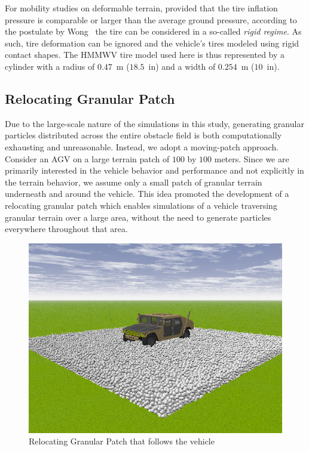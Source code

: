 \documentclass[12pt,twocolumn]{article}
\begin{document}
For mobility studies on deformable terrain, provided that the tire inflation pressure is comparable or larger than the average ground pressure, according to the postulate by Wong~\cite{wong93} the tire can be considered in a so-called {\em rigid regime}.  As such, tire deformation can be ignored and the vehicle's tires modeled using rigid contact shapes.  The HMMWV tire model used here is thus represented by a cylinder with a radius of $0.47$~m ($18.5$~in) and a width of $0.254$~m ($10$~in).



\subsection{Relocating Granular Patch }\label{ss:Patch}

Due to the large-scale nature of the simulations in this study, generating granular particles distributed across the entire obstacle field is both computationally exhausting and unreasonable. Instead, we adopt a moving-patch approach. Consider an AGV on a large terrain patch of $100$ by $100$ meters. Since we are primarily interested in the vehicle behavior and performance and not explicitly in the terrain behavior, we assume only a small patch of granular terrain underneath and around the vehicle. This idea promoted the development of a relocating granular patch which enables simulations of a vehicle traversing granular terrain over a large area, without the need to generate particles everywhere throughout that area. 

\begin{figure}
	\centering
	\includegraphics[width=0.8\columnwidth]{Figs/granPatch.png}
	\caption{\small Relocating Granular Patch that follows the vehicle}  
	\label{fig:granPatch}
\end{figure}
\end{document}
